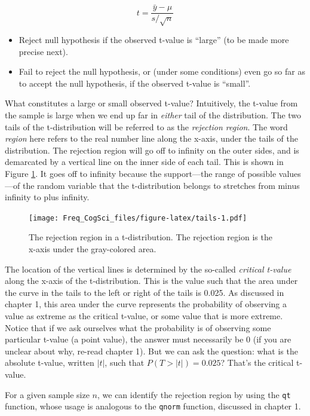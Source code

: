 \documentclass[12pt,]{krantz}
\providecommand{\tightlist}{%
  \setlength{\itemsep}{0pt}\setlength{\parskip}{0pt}}
\begin{document}
\begin{equation}
t=\frac{\bar{y}-\mu}{s/\sqrt{n}}
\end{equation}

\begin{itemize}
\tightlist
\item
  Reject null hypothesis if the observed t-value is ``large'' (to be made more precise next).
\item
  Fail to reject the null hypothesis, or (under some conditions) even go so far as to accept the null hypothesis, if the observed t-value is ``small''.
\end{itemize}

What constitutes a large or small observed t-value?
Intuitively, the t-value from the sample is large when we end up far in \emph{either} tail of the distribution. The two tails of the t-distribution will be referred to as the \emph{rejection region}. The word \emph{region} here refers to the real number line along the x-axis, under the tails of the distribution. The rejection region will go off to infinity on the outer sides, and is demarcated by a vertical line on the inner side of each tail. This is shown in Figure \ref{fig:tails}. It goes off to infinity because the support---the range of possible values---of the random variable that the t-distribution belongs to stretches from minus infinity to plus infinity.

\begin{figure}
\centering
\texttt{[image: Freq\_CogSci\_files/figure-latex/tails-1.pdf]}
\caption{\label{fig:tails}The rejection region in a t-distribution. The rejection region is the x-axis under the gray-colored area.}
\end{figure}

The location of the vertical lines is determined by the so-called \emph{critical t-value} along the x-axis of the t-distribution. This is the value such that the area under the curve in the tails to the left or right of the tails is 0.025. As discussed in chapter 1, this area under the curve represents the probability of observing a value as extreme as the critical t-value, or some value that is more extreme. Notice that if we ask ourselves what the probability is of observing some particular t-value (a point value), the answer must necessarily be \(0\) (if you are unclear about why, re-read chapter 1). But we can ask the question: what is the absolute t-value, written \(|t|\), such that \(P(T>|t|)=0.025\)? That's the critical t-value.

For a given sample size \(n\), we can identify the rejection region by using the \texttt{qt} function, whose usage is analogous to the \texttt{qnorm} function, discussed in chapter 1.
\end{document}
